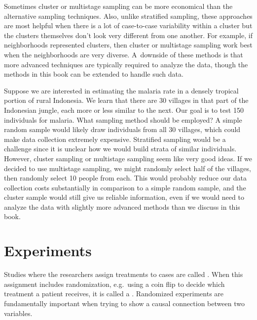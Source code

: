 Sometimes cluster or multistage sampling can be more economical
than the alternative sampling techniques.
Also, unlike stratified sampling, these approaches are most
helpful when there is a lot of case-to-case variability within
a cluster but the clusters themselves don't look very different
from one another.
For example, if neighborhoods represented clusters, then cluster
or multistage sampling work best when the neighborhoods are very
diverse.
A~downside of these methods is that more advanced techniques
are typically required to analyze the data, though the methods
in this book can be extended to handle such data.

\begin{examplewrap}
\begin{nexample}{Suppose we are interested in estimating
    the malaria rate in a densely tropical portion of rural
    Indonesia.
    We learn that there are 30 villages in that part of the
    Indonesian jungle, each more or less similar to the next.
    Our goal is to test 150 individuals for malaria.
    What sampling method should be employed?}
  A simple random sample would likely draw individuals from
  all 30 villages, which could make data collection extremely
  expensive.
  Stratified sampling would be a challenge since it is
  unclear how we would build strata of similar individuals.
  However, cluster sampling or multistage sampling seem like
  very good ideas.
  If we decided to use multistage sampling, we might randomly
  select half of the villages, then randomly select
  10 people from each.
  This would probably reduce our data collection costs
  substantially in comparison to a simple random sample,
  and the cluster sample would still give us reliable
  information, even if we would need to analyze the data
  with slightly more advanced methods than we discuss
  in this book.
\end{nexample}
\end{examplewrap}


{}






\section{Experiments}
\label{experimentsSection}

Studies where the researchers assign treatments to cases are called . When this assignment includes randomization, e.g.~using a coin flip to decide which treatment a patient receives, it is called a . Randomized experiments are fundamentally important when trying to show a causal connection between two variables.


